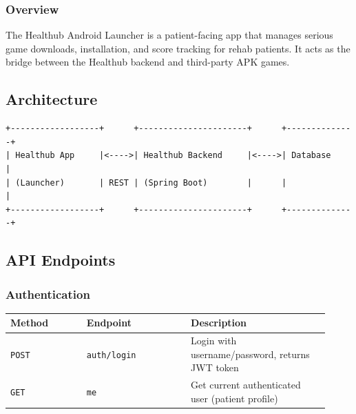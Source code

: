 \providecommand{\tightlist}{}

\subsubsection{Overview}

The Healthub Android Launcher is a patient-facing app that manages
serious game downloads, installation, and score tracking for rehab
patients. It acts as the bridge between the Healthub backend and
third-party APK games.

\subsection{Architecture}\label{architecture}

\begin{verbatim}
+------------------+      +----------------------+      +--------------+
| Healthub App     |<---->| Healthub Backend     |<---->| Database     |
| (Launcher)       | REST | (Spring Boot)        |      |              |
+------------------+      +----------------------+      +--------------+
\end{verbatim}

\subsection{API Endpoints}\label{api-endpoints}

\subsubsection{Authentication}\label{authentication}

\begin{longtable}{p{0.22\linewidth}p{0.30\linewidth}p{0.40\linewidth}}

\toprule\noalign{}
\begin{minipage}[b]{\linewidth}\raggedright
Method
\end{minipage} & \begin{minipage}[b]{\linewidth}\raggedright
Endpoint
\end{minipage} & \begin{minipage}[b]{\linewidth}\raggedright
Description
\end{minipage} \\
\midrule\noalign{}
\endhead
\bottomrule\noalign{}
\endlastfoot
\texttt{POST} & \texttt{auth/login} & Login with username/password,
returns JWT token \\
\texttt{GET} & \texttt{me} & Get current authenticated user (patient
profile) \\
\end{longtable}

